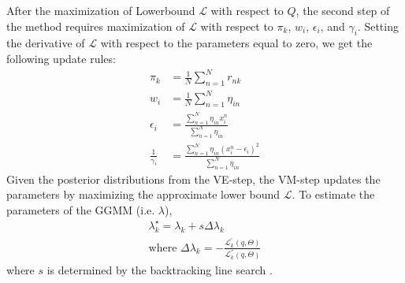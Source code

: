 \documentclass[letterpaper]{article}
\begin{document}
After the maximization of Lowerbound $\mathcal{L}$ with respect to $Q$, the second step
of the method requires maximization of $\mathcal{L}$ with respect to $\pi_k$, $w_i$, $\epsilon_i$,
and $\gamma_i$. Setting the derivative of $\mathcal{L}$ with respect to the parameters
equal to zero\cite{constantinopoulos2006bayesian}, we get the following update rules:
\begin{align}
    \label{pik}
    \pi_k &= \frac{1}{N}\sum_{n=1}^N r_{nk}
    \\
    \label{wi}
    w_i &= \frac{1}{N}\sum_{n=1}^N\eta_{in}
    \\
    \label{epsiloni}
    \epsilon_i &= \frac{\sum_{n=1}^N \eta_{in}x_i^n}{\sum_{n=1}^N\eta_{in}}
    \\
    \label{gammai}
    \frac{1}{\gamma_i} &= \frac{\sum_{n=1}^N \eta_{in}(x_i^n-\epsilon_i)^2}{\sum_{n=1}^N\eta_{in}}
\end{align}
        Given the posterior distributions from the VE-step, the VM-step updates the parameters by maximizing the approximate lower bound $\mathcal{L}$.
        To estimate the parameters of the GGMM (i.e. $\lambda$), 
        \begin{equation}
            \begin{split}\label{lambda}
                \lambda_k^\star = \lambda_k + s \Delta \lambda_k   \\
                \text{where }
                \Delta\lambda_k = - \frac{\mathcal{L}^{'}_k(q, \Theta)}{\mathcal{L}^{''}_k(q, \Theta)}
            \end{split}
        \end{equation}
        where $s$ is determined by the backtracking line search \cite{b6}. 
\end{document}
